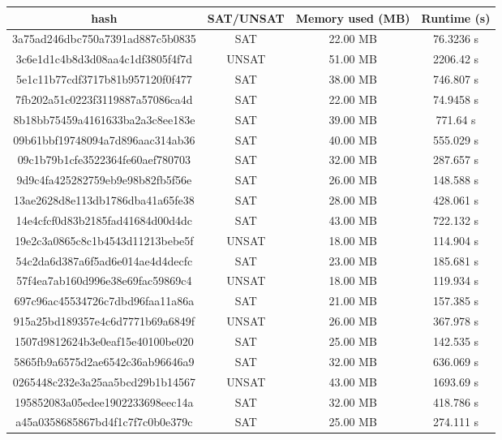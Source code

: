 \renewcommand{\arraystretch}{0.8}
\begin{table}[h!]
  \centering
  \begin{tabular}{|c|c|c|c|}
    \hline
    \cline{2-4}
    hash & SAT/UNSAT & Memory used (MB) & Runtime (s) \\
    \hline
    3a75ad246dbc750a7391ad887c5b0835 & SAT & 22.00 MB & 76.3236 s \\
    \hline
    3c6e1d1c4b8d3d08aa4c1df3805f4f7d & UNSAT & 51.00 MB & 2206.42 s \\
    \hline
    5e1c11b77cdf3717b81b957120f0f477 & SAT & 38.00 MB & 746.807 s \\
    \hline
    7fb202a51c0223f3119887a57086ca4d & SAT & 22.00 MB & 74.9458 s \\
    \hline
    8b18bb75459a4161633ba2a3c8ee183e & SAT & 39.00 MB & 771.64 s \\
    \hline
    09b61bbf19748094a7d896aac314ab36 & SAT & 40.00 MB & 555.029 s \\
    \hline
    09c1b79b1cfe3522364fe60aef780703 & SAT & 32.00 MB & 287.657 s \\
    \hline
    9d9c4fa425282759eb9e98b82fb5f56e & SAT & 26.00 MB & 148.588 s \\
    \hline
    13ae2628d8e113db1786dba41a65fe38 & SAT & 28.00 MB & 428.061 s \\
    \hline
    14e4cfcf0d83b2185fad41684d00d4dc & SAT & 43.00 MB & 722.132 s \\
    \hline
    19e2c3a0865c8c1b4543d11213bebe5f & UNSAT & 18.00 MB & 114.904 s \\
    \hline
    54c2da6d387a6f5ad6e014ae4d4decfc & SAT & 23.00 MB & 185.681 s \\
    \hline
    57f4ea7ab160d996e38e69fac59869c4 & UNSAT & 18.00 MB & 119.934 s \\
    \hline
    697c96ac45534726c7dbd96faa11a86a & SAT & 21.00 MB & 157.385 s \\
    \hline
    915a25bd189357e4c6d7771b69a6849f & UNSAT & 26.00 MB & 367.978 s \\
    \hline
    1507d9812624b3e0eaf15e40100be020 & SAT &  25.00 MB & 142.535 s \\
    \hline
    5865fb9a6575d2ae6542c36ab96646a9 & SAT & 32.00 MB & 636.069 s \\
    \hline
    0265448c232e3a25aa5bcd29b1b14567 & UNSAT & 43.00 MB & 1693.69 s \\
    \hline
    195852083a05edee1902233698eec14a & SAT & 32.00 MB & 418.786 s \\
    \hline
    a45a0358685867bd4f1c7f7c0b0e379c & SAT & 25.00 MB & 274.111 s \\

\end{tabular}
\end{table}
